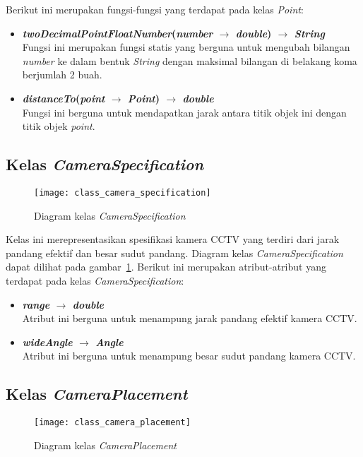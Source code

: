 Berikut ini merupakan fungsi-fungsi yang terdapat pada kelas \textit{Point}:
\begin{itemize}
	\item \textbf{\textit{twoDecimalPointFloatNumber}(\textit{number} \(\rightarrow\) \textit{double}) \(\rightarrow\) \textit{String}}\\
	Fungsi ini merupakan fungsi statis yang berguna untuk mengubah bilangan \textit{number} ke dalam bentuk \textit{String} dengan maksimal bilangan di belakang koma berjumlah 2 buah.
	\item \textbf{\textit{distanceTo}(\textit{point} \(\rightarrow\) \textit{Point}) \(\rightarrow\) \textit{double}}\\
	Fungsi ini berguna untuk mendapatkan jarak antara titik objek ini dengan titik objek \textit{point}.
\end{itemize}

\subsection{Kelas \textit{CameraSpecification}}
\begin{figure}[H]
	\centering  
	\texttt{[image: class\_camera\_specification]}
	\caption[Diagram kelas \textit{CameraSpecification}]{Diagram kelas \textit{CameraSpecification}}
	\label{fig:class_camera_specification}
\end{figure}

Kelas ini merepresentasikan spesifikasi kamera CCTV yang terdiri dari jarak pandang efektif dan besar sudut pandang. Diagram kelas \textit{CameraSpecification} dapat dilihat pada gambar~\ref{fig:class_camera_specification}. Berikut ini merupakan atribut-atribut yang terdapat pada kelas \textit{CameraSpecification}:
\begin{itemize}
	\item \textbf{\textit{range} \(\rightarrow\) \textit{double}}\\
	Atribut ini berguna untuk menampung jarak pandang efektif kamera CCTV.
	\item \textbf{\textit{wideAngle} \(\rightarrow\) \textit{Angle}}\\
	Atribut ini berguna untuk menampung besar sudut pandang kamera CCTV.
\end{itemize}

\subsection{Kelas \textit{CameraPlacement}}
\begin{figure}[H]
	\centering  
	\texttt{[image: class\_camera\_placement]}
	\caption[Diagram kelas \textit{CameraPlacement}]{Diagram kelas \textit{CameraPlacement}}
	\label{fig:class_camera_placement}
\end{figure}

